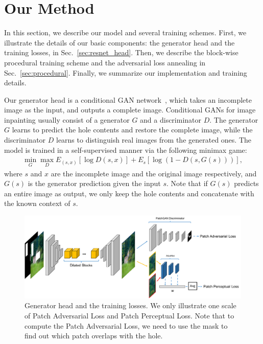 \section{Our Method}

In this section, we describe our model and several training schemes. First, we illustrate the details of our basic components: the generator head and the training losses, in Sec.~\ref{sec:resnet_head}. Then, we describe the block-wise procedural training scheme and the adversarial loss annealing in Sec.~\ref{sec:procedural}. Finally, we summarize our implementation and training details. 

Our generator head is a conditional GAN network~\cite{mirza2014conditional}, which takes an incomplete image as the input, and outputs a complete image. Conditional GANs for image inpainting usually consist of a generator $G$ and a discriminator $D$. The generator $G$ learns to predict the hole contents and restore the complete image, while the discriminator $D$ learns to distinguish real images from the generated ones. The model is trained in a self-supervised manner via the following minimax game:
\begin{eqnarray}
\min\limits_G \max\limits_D E_{(s,x)}[\log D(s,x)] + E_s[\log (1-D(s,G(s)))],
\end{eqnarray}
where $s$ and $x$ are the incomplete image and the original image respectively, and $G(s)$ is the generator prediction given the input $s$. Note that if $G(s)$ predicts an entire image as output, we only keep the hole contents and concatenate with the known context of $s$.

\begin{figure}[t]
\centering
\small
\includegraphics[width=1\textwidth]{figures/arch.pdf}
\caption{Generator head and the training losses. We only illustrate one scale of Patch Adversarial Loss and Patch Perceptual Loss. Note that to compute the Patch Adversarial Loss, we need to use the mask to find out which patch overlaps with the hole.}
\label{fig:model}
\vspace{-10pt}
\end{figure}

